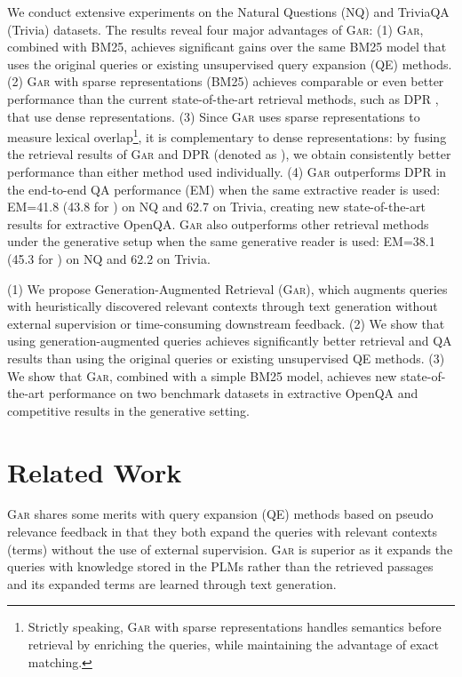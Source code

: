 \documentclass[11pt,a4paper]{article}
\newcommand{\ours}{\textsc{Gar}\xspace}
\newcommand{\oursPlus}{\xspace}
\begin{document}
We conduct extensive experiments on the Natural Questions (NQ) \cite{kwiatkowski-etal-2019-natural} and TriviaQA (Trivia) \cite{joshi-etal-2017-triviaqa} datasets. 
The results reveal four major advantages of \ours:
(1) \ours, combined with BM25, achieves significant gains over the same BM25 model that uses the original queries or existing unsupervised query expansion (QE) methods.
(2) \ours with sparse representations (BM25) achieves comparable or even better performance than the current state-of-the-art retrieval methods, such as DPR \cite{karpukhin2020dense}, that use dense representations.
(3) Since \ours uses sparse representations to measure lexical overlap\footnote{Strictly speaking, \ours with sparse representations handles semantics before retrieval by enriching the queries, while maintaining the advantage of exact matching.}, it is complementary to dense representations: by fusing the retrieval results of \ours and DPR (denoted as \oursPlus), we obtain consistently better performance than either method used individually.
(4) \ours outperforms DPR in the end-to-end QA performance (EM) when the same extractive reader is used: EM=41.8 (43.8 for \oursPlus) on NQ and 62.7 on Trivia, creating new state-of-the-art results for extractive OpenQA. \ours also outperforms other retrieval methods under the generative setup when the same generative reader is used: EM=38.1 (45.3 for \oursPlus) on NQ and 62.2 on Trivia.




(1) We propose Generation-Augmented Retrieval (\ours), which augments queries with heuristically discovered relevant contexts through text generation without external supervision or time-consuming downstream feedback. 
(2) We show that using generation-augmented queries achieves significantly better retrieval and QA results than using the original queries or existing unsupervised QE methods. (3) We show that \ours, combined with a simple BM25 model, achieves new state-of-the-art performance on two benchmark datasets in extractive OpenQA and competitive results in the generative setting.





\section{Related Work}
\label{sec:related_work}
\ours shares some merits with query expansion (QE) methods based on pseudo relevance feedback \cite{rocchio1971relevance,abdul2004umass,lv2010positional} in that they both expand the queries with relevant contexts (terms) without the use of external supervision. \ours is superior as it expands the queries with knowledge stored in the PLMs rather than the retrieved passages and its expanded terms are learned through text generation.
\end{document}
